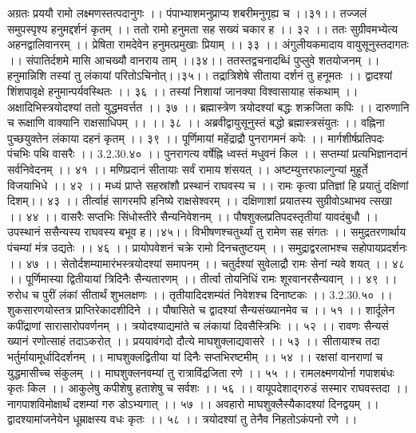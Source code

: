 अग्रतः प्रययौ रामो लक्ष्मणस्तत्पदानुगः ।।
पंपाभ्याशमनुप्राप्य शबरीमनुगृह्य च ।।३१।।
तज्जलं समुपस्पृश्य हनुमद्दर्शनं कृतम् ।।
ततो रामो हनुमता सह सख्यं चकार ह ।। ३२ ।।
ततः सुग्रीवमभ्येत्य अहनद्वालिवानरम् ।।
प्रेषिता रामदेवेन हनुमत्प्रमुखाः प्रियाम् ।। ३३ ।।
अंगुलीयकमादाय वायुसूनुस्तदागतः ।।
संपातिर्दशमे मासि आचख्यौ वानराय ताम् ।।३४।।
ततस्तद्वचनादब्धिं पुप्लुवे शतयोजनम् ।।
हनुमान्निशि तस्यां तु लंकायां परितोऽचिनोत्।।३५।।
तद्रात्रिशेषे सीताया दर्शनं तु हनूमतः ।।
द्वादश्यां शिंशपावृक्षे हनुमान्पर्यवस्थितः ।। ३६ ।।
तस्यां निशायां जानक्या विश्वासायाह संकथाम् ।।
अक्षादिभिस्त्रयोदश्यां ततो युद्धमवर्त्तत ।। ३७ ।।
ब्रह्मास्त्रेण त्रयोदश्यां बद्धः शक्रजिता कपिः ।।
दारुणानि च रूक्षाणि वाक्यानि राक्षसाधिपम् ।। ।। ३८ ।।
अब्रवीद्वायुसूनुस्तं बद्धो ब्रह्मास्त्रसंयुतः ।।
वह्निना पुच्छयुक्तेन लंकाया दहनं कृतम् ।। ३९ ।।
पूर्णिमायां महेंद्राद्रौ पुनरागमनं कपेः ।।
मार्गशीर्षप्रतिपदः पंचभिः पथि वासरैः ।। 3.2.30.४० ।।
पुनरागत्य वर्षेह्नि ध्वस्तं मधुवनं किल ।।
सप्तम्यां प्रत्यभिज्ञानदानं सर्वनिवेदनम् ।। ४१ ।।
मणिप्रदानं सीतायाः सर्वं रामाय शंसयत् ।।
अष्टम्युत्तरफाल्गुन्यां मुहूर्ते विजयाभिधे ।। ४२ ।।
मध्यं प्राप्ते सहस्रांशौ प्रस्थानं राघवस्य च ।।
रामः कृत्वा प्रतिज्ञां हि प्रयातुं दक्षिणां दिशम्।। ४३ ।।
तीर्त्वाहं सागरमपि हनिष्ये राक्षसेश्वरम् ।।
दक्षिणाशां प्रयातस्य सुग्रीवोऽथाभव त्सखा ।। ४४ ।।
वासरैः सप्तभिः सिंधोस्तीरे सैन्यनिवेशनम् ।।
पौषशुक्लप्रतिपदस्तृतीयां यावदंबुधौ ।।
उपस्थानं ससैन्यस्य राघवस्य बभूव ह।।४५।।
विभीषणश्चतुर्थ्यां तु रामेण सह संगतः ।।
समुद्रतरणार्थाय पंचम्यां मंत्र उद्यतेः ।। ४६ ।।
प्रायोपवेशनं चक्रे रामो दिनचतुष्टयम् ।।
समुद्राद्वरलाभश्च सहोपायप्रदर्शनः ।। ४७ ।।
सेतोर्दशम्यामारंभस्त्रयोदश्यां समापनम् ।।
चतुर्दश्यां सुवेलाद्रौ रामः सेनां न्यवे शयत् ।। ४८ ।।
पूर्णिमास्या द्वितीयायां त्रिदिनैः सैन्यतारणम् ।।
तीर्त्वा तोयनिधिं रामः शूरवानरसैन्यवान् ।। ४९ ।।
रुरोध च पुरीं लंकां सीतार्थं शुभलक्षणः ।।
तृतीयादिदशम्यंतं निवेशश्च दिनाष्टकः ।। 3.2.30.५० ।।
शुकसारणयोस्तत्र प्राप्तिरेकादशीदिने ।।
पौषासिते च द्वादश्यां सैन्यसंख्यानमेव च ।। ५१ ।।
शार्दूलेन कपींद्राणां सारासारोपवर्णनम् ।।
त्रयोदश्याद्यमांते च लंकायां दिवसैस्त्रिभिः ।। ५२ ।।
रावणः सैन्यसं ख्यानं रणोत्साहं तदाऽकरोत् ।।
प्रययावंगदो दौत्ये माघशुक्लाद्यवासरे ।। ५३ ।।
सीतायाश्च तदा भर्तुर्मायामूर्धादिदर्शनम् ।।
माघशुक्लद्वितीया यां दिनैः सप्तभिरष्टमीम् ।। ५४ ।।
रक्षसां वानराणां च युद्धमासीच्च संकुलम् ।।
माघशुक्लनवम्यां तु रात्राविंद्रजिता रणे ।। ५५ ।।
रामलक्ष्मणयोर्ना गपाशबंधः कृतः किल ।।
आकुलेषु कपीशेषु हताशेषु च सर्वशः ।। ५६ ।।
वायूपदेशाद्गरुडं सस्मार राघवस्तदा ।।
नागपाशविमोक्षार्थं दशम्यां गरु डोऽभ्यगात् ।। ५७ ।।
अवहारो माघशुक्लैस्यैकादश्यां दिनद्वयम् ।।
द्वादश्यामांजनेयेन धूम्राक्षस्य वधः कृतः ।। ५८ ।।
त्रयोदश्यां तु तेनैव निहतोऽकंपनो रणे ।।
